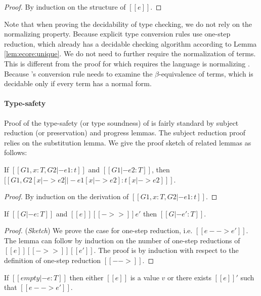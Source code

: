 \begin{proof}
	By induction on the structure of $[[e]]$.
\end{proof}

Note that when proving the decidability of type checking, we do not rely on the
normalizing property. Because explicit type conversion rules use one-step
reduction, which already has a decidable checking algorithm according to Lemma
\ref{lem:ecore:unique}. We do not need to further require the normalization of
terms. This is different from the proof for \cc which requires the language is
normalizing \cite{pts:normalize}. Because \cc's conversion rule needs to
examine the $\beta$-equivalence of terms, which is decidable only if every term
has a normal form.

\paragraph{Type-safety}
Proof of the type-safety (or type soundness) of \ecore is fairly standard by subject
reduction (or preservation) and progress lemmas. The subject reduction proof
relies on the substitution lemma. We give the proof sketch of related lemmas as
follows:

\begin{lem}[Substitution]\label{lem:ecore:subst}
	If $[[G1, x:T, G2 |- e1:t]]$ and $[[G1 |- e2:T]]$, then $[[G1, G2 [x |-> e2]
|- e1[x |-> e2]  : t[x |-> e2] ]]$.
\end{lem}

\begin{proof}
    By induction on the derivation of $[[G1, x:T, G2 |- e1:t]]$.
\end{proof}

\begin{thm}\label{lem:ecore:reduct}
If $[[G |- e:T]]$ and $[[e]] [[->>]] e'$ then $[[G |- e':T]]$.
\end{thm}

\begin{proof}
    (\emph{Sketch}) We prove the case for one-step reduction, i.e. $[[e -->
e']]$. The lemma can follow by induction on the number of one-step reductions
of $[[e]] [[->>]] [[e']]$.
    The proof is by induction with respect to the definition of one-step
reduction $[[-->]]$.
\end{proof}

\begin{thm}[Progress]\label{lem:ecore:prog}
If $[[empty |- e:T]]$ then either $[[e]]$ is a value $v$ or there exists $[[e]]'$
such that $[[e --> e']]$.
\end{thm}

